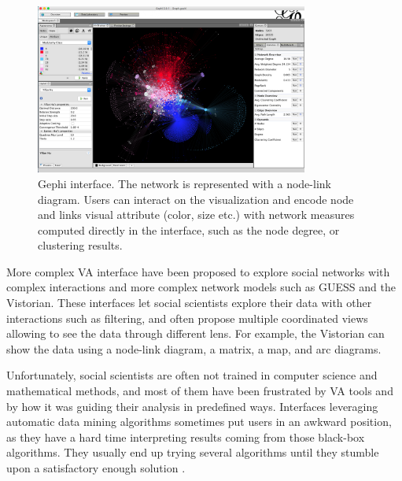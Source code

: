 \begin{figure}
    \centering %
    \includegraphics[width=0.8\textwidth]{static/figures/RelatedWork/Gephi_0.9.1_Network_Analysis_and_Visualization_Software}
    \caption{Gephi \cite{Gephi} interface. The network is represented with a node-link diagram. Users can interact on the visualization and encode node and links visual attribute (color, size etc.) with network measures computed directly in the interface, such as the node degree, or clustering results.}
    \label{fig:gephi}
\end{figure}
More complex VA interface have been proposed to explore social networks with complex interactions and more complex network models such as GUESS and the Vistorian.
These interfaces let social scientists explore their data with other interactions such as filtering, and often propose multiple coordinated views allowing to see the data through different lens.
For example, the Vistorian can show the data using a node-link diagram, a matrix, a map, and arc diagrams.

Unfortunately, social scientists are often not trained in computer science and mathematical methods, and most of them have been frustrated by VA tools and by how it was guiding their analysis in predefined ways.
Interfaces leveraging automatic data mining algorithms sometimes put users in an awkward position, as they have a hard time interpreting results coming from those black-box algorithms.
They usually end up trying several algorithms until they stumble upon a satisfactory enough solution \cite{pisterIntegratingPriorKnowledge2021}.

